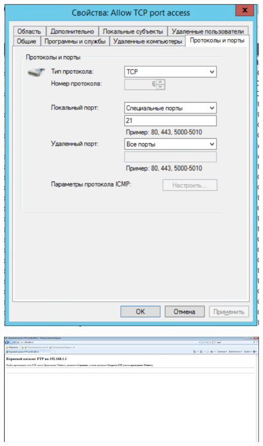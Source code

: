 \documentclass[a4paper,14pt]{extarticle}
\begin{document}
    \begin{center}
        \includegraphics[scale=0.7]{8.1.2.png}
    \end{center}

    \begin{center}
        \includegraphics[scale=0.4]{8.1.3.png}
    \end{center}
\end{document}
